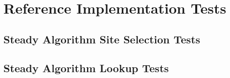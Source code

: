 % 


% 


\section{Reference Implementation Tests}

\subsection{Steady Algorithm Site Selection Tests}



\subsection{Steady Algorithm Lookup Tests}




% 



